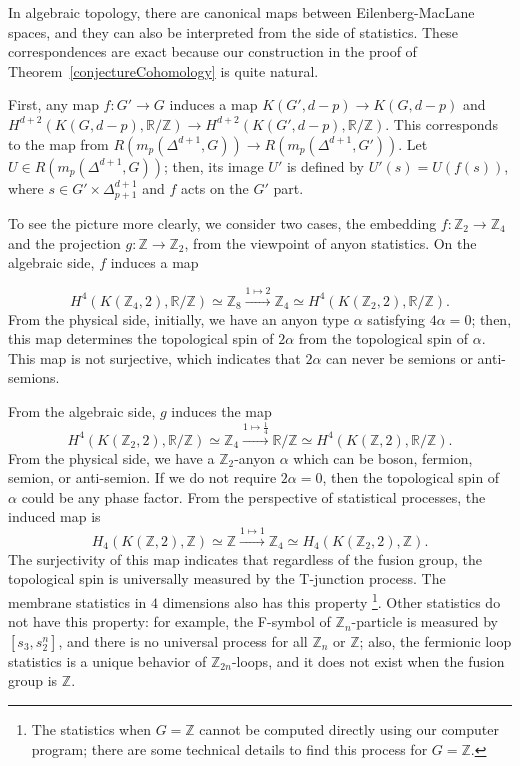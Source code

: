 \documentclass[reprint, amsmath, amssymb, showpacs, floatfix, longbibliography, aps, twocolumn, superscriptaddress, nofootinbib]{revtex4-2}
\newcommand{\ZZ}{{\mathbb Z}}
\newcommand{\RR}{{\mathbb R}}
\theoremstyle{definition}
\begin{document}
In algebraic topology, there are canonical maps between Eilenberg-MacLane spaces, and they can also be interpreted from the side of statistics. These correspondences are exact because our construction in the proof of Theorem~\ref{conjectureCohomology} is quite natural. 

First, any map $f:G'\rightarrow G$ induces a map $K(G',d-p)\rightarrow K(G,d-p)$ and  $H^{d+2}(K(G,d-p),\RR/\ZZ)\rightarrow H^{d+2}(K(G',d-p),\RR/\ZZ)$. This corresponds to the map from $R(m_p(\Delta^{d+1},G))\rightarrow R(m_p(\Delta^{d+1},G'))$. Let $U\in R(m_p(\Delta^{d+1},G))$; then, its image $U'$ is defined by $U'(s)=U(f(s))$, where $s\in G'\times \Delta^{d+1}_{p+1}$ and $f$ acts on the $G'$ part. 

To see the picture more clearly, we consider two cases, the embedding $f:\ZZ_2\rightarrow \ZZ_4$ and the projection $g: \ZZ\rightarrow\ZZ_2$, from the viewpoint of anyon statistics. On the algebraic side, $f$ induces a map

\begin{equation}
	H^4(K(\ZZ_4,2),\RR/\ZZ)\simeq \ZZ_8\xrightarrow{1\mapsto 2} \ZZ_4\simeq H^4(K(\ZZ_2,2),\RR/\ZZ).
\end{equation}
From the physical side, initially, we have an anyon type $\alpha$ satisfying $4\alpha=0$; then, this map determines the topological spin of $2\alpha$ from the topological spin of $\alpha$. This map is not surjective, which indicates that $2\alpha$ can never be semions or anti-semions.

From the algebraic side, $g$ induces the map
\begin{equation}
	H^4(K(\ZZ_2,2),\RR/\ZZ)\simeq \ZZ_4\xrightarrow{1\mapsto \frac{1}{4}} \RR/\ZZ\simeq H^4(K(\ZZ,2),\RR/\ZZ).
\end{equation}
From the physical side, we have a $\ZZ_2$-anyon $\alpha$ which can be boson, fermion, semion, or anti-semion. If we do not require $2\alpha=0$, then the topological spin of $\alpha$ could be any phase factor. From the perspective of statistical processes, the induced map is
\begin{equation}
	H_4(K(\ZZ,2),\ZZ)\simeq \ZZ\xrightarrow{1\mapsto1}\ZZ_4\simeq H_4(K(\ZZ_2,2),\ZZ).
\end{equation}
The surjectivity of this map indicates that regardless of the fusion group, the topological spin is universally measured by the T-junction process. The membrane statistics in $4$ dimensions also has this property \cite{feng2025anyonicmembranespontryaginstatistics}\footnote{The statistics when $G=\ZZ$ cannot be computed directly using our computer program; there are some technical details to find this process for $G=\ZZ$.}. Other statistics do not have this property: for example, the F-symbol of $\ZZ_n$-particle is measured by $[s_3,s_2^n]$, and there is no universal process for all $\ZZ_n$ or $\ZZ$; also, the fermionic loop statistics is a unique behavior of $\ZZ_{2n}$-loops, and it does not exist when the fusion group is $\ZZ$. 
\end{document}
